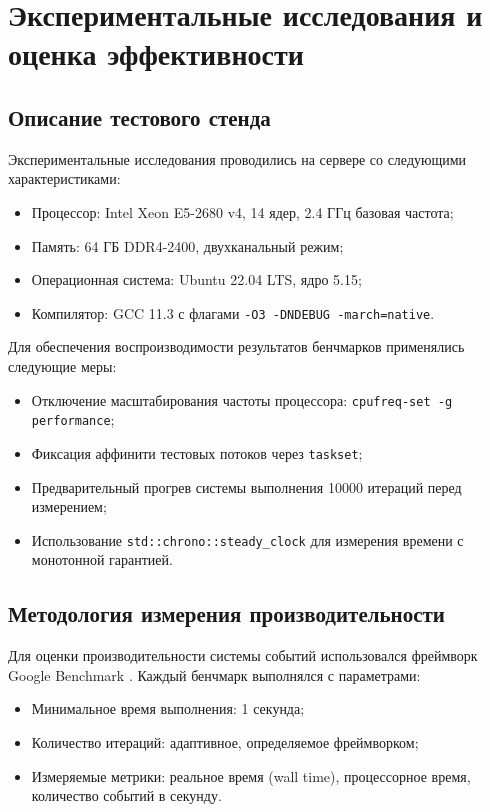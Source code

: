 \documentclass[12pt,a4paper]{report}
\begin{document}
\chapter{Экспериментальные исследования и оценка эффективности}
\section{Описание тестового стенда}
Экспериментальные исследования проводились на сервере со следующими характеристиками:
\begin{itemize}
    \item Процессор: Intel Xeon E5-2680 v4, 14 ядер, 2.4 ГГц базовая частота;
    \item Память: 64 ГБ DDR4-2400, двухканальный режим;
    \item Операционная система: Ubuntu 22.04 LTS, ядро 5.15;
    \item Компилятор: GCC 11.3 с флагами \texttt{-O3 -DNDEBUG -march=native}.
\end{itemize}

Для обеспечения воспроизводимости результатов бенчмарков применялись следующие меры:
\begin{itemize}
    \item Отключение масштабирования частоты процессора: \texttt{cpufreq-set -g performance};
    \item Фиксация аффинити тестовых потоков через \texttt{taskset};
    \item Предварительный прогрев системы выполнения 10000 итераций перед измерением;
    \item Использование \texttt{std::chrono::steady\_clock} для измерения времени с монотонной гарантией.
\end{itemize}

\section{Методология измерения производительности}
Для оценки производительности системы событий использовался фреймворк Google Benchmark \cite{googlebenchmark2023}. Каждый бенчмарк выполнялся с параметрами:
\begin{itemize}
    \item Минимальное время выполнения: 1 секунда;
    \item Количество итераций: адаптивное, определяемое фреймворком;
    \item Измеряемые метрики: реальное время (wall time), процессорное время, количество событий в секунду.
\end{itemize}
\end{document}
